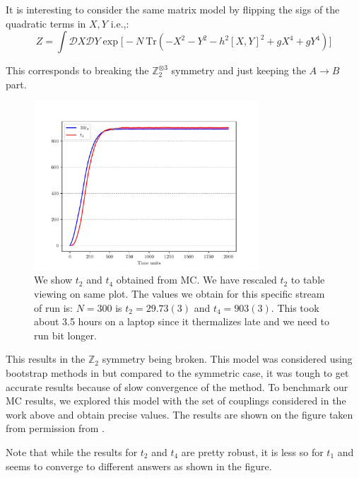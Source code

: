 \documentclass[11pt]{article}
\begin{document}
It is interesting to consider the same matrix model by flipping the sigs of the quadratic terms in $X,Y$ i.e.,:
\begin{equation}
\label{eq:GHM2} 
Z = \int \mathcal{D}X \mathcal{D}Y \exp \Big[-N ~ \mbox{Tr} (-X^2  -Y^2 - h^2 [X,Y]^2 + gX^4 + gY^4) \Big]	
\end{equation} 

This corresponds to breaking the $\mathbb{Z}_{2}^{\otimes 3}$ symmetry and just keeping the $A \to B$ part. 


\begin{figure}[htbp] 
	\centering 
	\includegraphics[width=0.75\textwidth]{figs/2MM_symb_t2_t4.pdf}
	\caption{\label{fig:2MM_t2t4}We show $t_{2}$ and $t_{4}$ obtained from MC. We have rescaled $t_{2}$ to
	table viewing on same plot. The values we obtain for this specific stream of run is: $N=300$ is $t_{2} = 29.73(3)$ and $t_{4} = 903(3)$. This took about 3.5 hours on a laptop since it thermalizes late and we need to run bit longer.}
\end{figure}

This results in the $\mathbb{Z}_{2}$ 
symmetry being broken. This model was considered using bootstrap methods in 
\cite{} but compared to the symmetric case, it was tough to get accurate results 
because of slow convergence of the method. To benchmark our MC results, we explored this model
with the set of couplings considered in the work above and obtain precise values. 
The results are shown on the figure taken from permission from \cite{}. 

Note that while the results for $t_{2}$ and $t_{4}$ are pretty robust, 
it is less so for $t_{1}$ and seems to converge to different answers as shown
in the figure.
\end{document}

